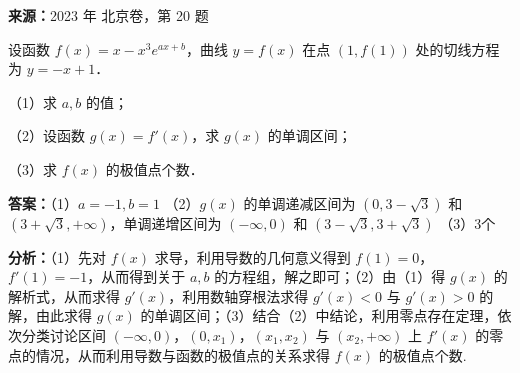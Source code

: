 \begin{question}[points=15]
\textbf{来源：}2023 年 北京卷，第 20 题\par
设函数 $f(x) = x - x^3 e^{ax+b}$，曲线 $y=f(x)$ 在点 $(1,f(1))$ 处的切线方程为 $y = -x+1$．

（1）求 $a,b$ 的值；

（2）设函数 $g(x) = f'(x)$，求 $g(x)$ 的单调区间；

（3）求 $f(x)$ 的极值点个数．
\begin{solution}
\textbf{答案：}（1）$a=-1,b=1$ （2）$g(x)$ 的单调递减区间为 $(0,3-\sqrt{3})$ 和 $(3+\sqrt{3},+\infty)$，单调递增区间为 $(-\infty,0)$ 和 $(3-\sqrt{3},3+\sqrt{3})$ （3）3个

\textbf{分析：}（1）先对 $f(x)$ 求导，利用导数的几何意义得到 $f(1)=0$，$f'(1)=-1$，从而得到关于 $a,b$ 的方程组，解之即可；（2）由（1）得 $g(x)$ 的解析式，从而求得 $g'(x)$，利用数轴穿根法求得 $g'(x)<0$ 与 $g'(x)>0$ 的解，由此求得 $g(x)$ 的单调区间；（3）结合（2）中结论，利用零点存在定理，依次分类讨论区间 $(-\infty,0)$，$(0,x_1)$，$(x_1,x_2)$ 与 $(x_2,+\infty)$ 上 $f'(x)$ 的零点的情况，从而利用导数与函数的极值点的关系求得 $f(x)$ 的极值点个数.


\end{solution}
\end{question}
